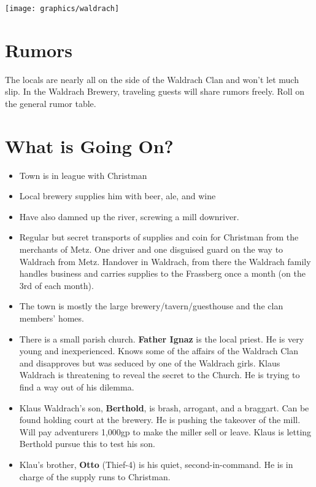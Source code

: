 \documentclass[
]{book}
\begin{document}
\begin{center}\texttt{[image: graphics/waldrach]} \end{center}

\section{Rumors}\label{rumors-2}

The locals are nearly all on the side of the Waldrach Clan and won't let much slip. In the Waldrach Brewery, traveling guests will share rumors freely. Roll on the general rumor table.

\section{What is Going On?}\label{what-is-going-on-1}

\begin{itemize}
\item
  Town is in league with Christman
\item
  Local brewery supplies him with beer, ale, and wine
\item
  Have also damned up the river, screwing a mill downriver.
\item
  Regular but secret transports of supplies and coin for Christman from the merchants of Metz. One driver and one disguised guard on the way to Waldrach from Metz. Handover in Waldrach, from there the Waldrach family handles business and carries supplies to the Frassberg once a month (on the 3rd of each month).
\item
  The town is mostly the large brewery/tavern/guesthouse and the clan members' homes.
\item
  There is a small parish church. \textbf{Father Ignaz} is the local priest. He is very young and inexperienced. Knows some of the affairs of the Waldrach Clan and disapproves but was seduced by one of the Waldrach girls. Klaus Waldrach is threatening to reveal the secret to the Church. He is trying to find a way out of his dilemma.
\item
  Klaus Waldrach's son, \textbf{Berthold}, is brash, arrogant, and a braggart. Can be found holding court at the brewery. He is pushing the takeover of the mill. Will pay adventurers 1,000gp to make the miller sell or leave. Klaus is letting Berthold pursue this to test his son.
\item
  Klau's brother, \textbf{Otto} (Thief-4) is his quiet, second-in-command. He is in charge of the supply runs to Christman.
\end{itemize}
\end{document}
